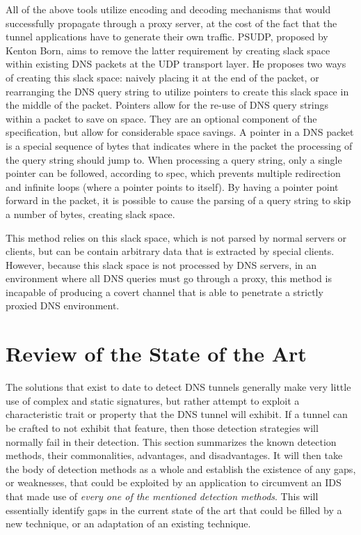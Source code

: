 \documentclass[12pt]{report}
\theoremstyle{remark}
\theoremstyle{definition}
\theoremstyle{definition}
\theoremstyle{definition}
\begin{document}
All of the above tools utilize encoding and decoding mechanisms that would
successfully propagate through a proxy server, at the cost of the fact that the
tunnel applications have to generate their own traffic. PSUDP, proposed by
Kenton Born, aims to remove the latter requirement by creating slack space
within existing DNS packets at the UDP transport layer. He proposes two ways
of creating this slack space: naively placing it at the end of the packet, or
rearranging the DNS query string to utilize pointers to create this slack space
in the middle of the packet. Pointers allow for the re-use of DNS query strings
within a packet to save on space. They are an optional component of the
specification, but allow for considerable space savings. A pointer in a DNS
packet is a special sequence of bytes that indicates where in the packet the
processing of the query string should jump to. When processing a query string,
only a single pointer can be followed, according to spec, which prevents
multiple redirection and infinite loops (where a pointer points to itself). By
having a pointer point forward in the packet, it is possible to cause the
parsing of a query string to skip a number of bytes, creating slack space.

This method relies on this slack space, which is not parsed by normal servers or
clients, but can be contain arbitrary data that is extracted by special clients.
However, because this slack space is not processed by DNS servers, in an
environment where all DNS queries must go through a proxy, this method is
incapable of producing a covert channel that is able to penetrate a strictly
proxied DNS environment.

\newpage

\chapter{Review of the State of the Art}
\label{litreview}
The solutions that exist to date to detect DNS tunnels generally make very
little use of complex and static signatures, but rather attempt to exploit a
characteristic trait or property that the DNS tunnel will exhibit. If a tunnel
can be crafted to not exhibit that feature, then those detection strategies will
normally fail in their detection. This section summarizes the known detection
methods, their commonalities, advantages, and disadvantages. It will then take
the body of detection methods as a whole and establish the existence of any
gaps, or weaknesses, that could be exploited by an application to circumvent an
IDS that made use of \emph{every one of the mentioned detection methods}. This
will essentially identify gaps in the current state of the art that could be
filled by a new technique, or an adaptation of an existing technique.
\end{document}
